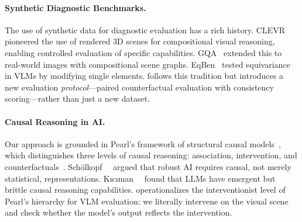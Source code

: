\paragraph{Synthetic Diagnostic Benchmarks.}
The use of synthetic data for diagnostic evaluation has a rich history. CLEVR~\cite{johnson2017clevr} pioneered the use of rendered 3D scenes for compositional visual reasoning, enabling controlled evaluation of specific capabilities. GQA~\cite{hudson2019gqa} extended this to real-world images with compositional scene graphs. EqBen~\cite{wang2023eqben} tested equivariance in VLMs by modifying single elements. \method follows this tradition but introduces a new evaluation \emph{protocol}---paired counterfactual evaluation with consistency scoring---rather than just a new dataset.

\paragraph{Causal Reasoning in AI.}
Our approach is grounded in Pearl's framework of structural causal models~\cite{pearl2009causality}, which distinguishes three levels of causal reasoning: association, intervention, and counterfactuals~\cite{pearl2018bookofwhy}. Sch{\"o}lkopf~\etal~\cite{scholkopf2021causal} argued that robust AI requires causal, not merely statistical, representations. K{\i}c{\i}man~\etal~\cite{kiciman2023causal} found that LLMs have emergent but brittle causal reasoning capabilities. \method operationalizes the interventionist level of Pearl's hierarchy for VLM evaluation: we literally intervene on the visual scene and check whether the model's output reflects the intervention.
